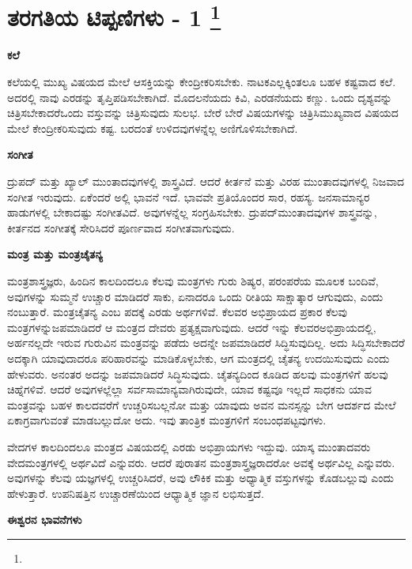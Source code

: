 
\chapter[ತರಗತಿಯ ಟಿಪ್ಪಣಿಗಳು - 1 ]{ತರಗತಿಯ ಟಿಪ್ಪಣಿಗಳು - 1 \protect\footnote{}}

\centerline{\textbf{ಕಲೆ}}

ಕಲೆಯಲ್ಲಿ ಮುಖ್ಯ ವಿಷಯದ ಮೇಲೆ ಆಸಕ್ತಿಯನ್ನು ಕೇಂದ್ರೀಕರಿಸಬೇಕು. ನಾಟಕ\break ಎಲ್ಲಕ್ಕಿಂತಲೂ ಬಹಳ ಕಷ್ಟವಾದ ಕಲೆ. ಅದರಲ್ಲಿ ನಾವು ಎರಡನ್ನು ತೃಪ್ತಿಪಡಿಸಬೇಕಾಗಿದೆ. ಮೊದಲನೆಯದು ಕಿವಿ, ಎರಡನೆಯದು ಕಣ್ಣು. ಒಂದು ದೃಶ್ಯವನ್ನು ಚಿತ್ರಿಸಬೇಕಾದರೆ\break ಒಂದು ವಸ್ತುವನ್ನು ಚಿತ್ರಿಸುವುದು ಸುಲಭ. ಬೇರೆ ಬೇರೆ ವಿಷಯಗಳನ್ನು ಚಿತ್ರಿಸಿ\break ಮುಖ್ಯವಾದ ವಿಷಯದ ಮೇಲೆ ಕೇಂದ್ರೀಕರಿಸುವುದು ಕಷ್ಟ. ಬರದಂತೆ ಉಳಿದವುಗಳನ್ನೆಲ್ಲ ಅಣಿಗೊಳಿಸಬೇಕಾಗಿದೆ.

\centerline{\textbf{ಸಂಗೀತ}}

ದ್ರುಪದ್​ ಮತ್ತು ಖ್ಯಾಲ್​ ಮುಂತಾದವುಗಳಲ್ಲಿ ಶಾಸ್ತ್ರವಿದೆ. ಆದರೆ ಕೀರ್ತನೆ ಮತ್ತು ವಿರಹ ಮುಂತಾದವುಗಳಲ್ಲಿ ನಿಜವಾದ ಸಂಗೀತ ಇರುವುದು. ಏಕೆಂದರೆ ಅಲ್ಲಿ ಭಾವನೆ ಇದೆ. ಭಾವವೇ ಪ್ರತಿಯೊಂದರ ಸಾರ, ರಹಸ್ಯ. ಜನಸಾಮಾನ್ಯರ ಹಾಡುಗಳಲ್ಲಿ ಬೇಕಾದಷ್ಟು ಸಂಗೀತವಿದೆ. ಅವುಗಳನ್ನೆಲ್ಲ ಸಂಗ್ರಹಿಸಬೇಕು. ದ್ರುಪದ್​ ಮುಂತಾದವುಗಳ ಶಾಸ್ತ್ರವನ್ನು, ಕೀರ್ತನದ ಸಂಗೀತಕ್ಕೆ ಸೇರಿಸಿದರೆ ಪೂರ್ಣವಾದ ಸಂಗೀತವಾಗುವುದು.

\centerline{\textbf{ಮಂತ್ರ ಮತ್ತು ಮಂತ್ರಚೈತನ್ಯ}}

ಮಂತ್ರಶಾಸ್ತ್ರಜ್ಞರು, ಹಿಂದಿನ ಕಾಲದಿಂದಲೂ ಕೆಲವು ಮಂತ್ರಗಳು ಗುರು ಶಿಷ್ಯರ, ಪರಂಪರೆಯ ಮೂಲಕ ಬಂದಿವೆ, ಅವುಗಳನ್ನು ಸುಮ್ಮನೆ ಉಚ್ಚಾರ ಮಾಡಿದರೆ ಸಾಕು, ಏನಾದರೂ ಒಂದು ರೀತಿಯ ಸಾಕ್ಷಾತ್ಕಾರ ಆಗುವುದು, ಎಂದು ನಂಬುತ್ತಾರೆ. ಮಂತ್ರಚೈತನ್ಯ ಎಂಬ ಪದಕ್ಕೆ ಎರಡು ಅರ್ಥಗಳಿವೆ. ಕೆಲವರ ಅಭಿಪ್ರಾಯದ ಪ್ರಕಾರ ಕೆಲವು ಮಂತ್ರಗಳನ್ನು\break ಜಪಮಾಡಿದರೆ ಆ ಮಂತ್ರದ ದೇವರು ಪ್ರತ್ಯಕ್ಷವಾಗುವುದು. ಆದರೆ ಇನ್ನು ಕೆಲವರ\break ಅಭಿಪ್ರಾಯದಲ್ಲಿ, ಅರ್ಹನಲ್ಲದೇ ಇರುವ ಗುರುವಿನ ಮಂತ್ರವನ್ನು ಪಡೆದು ಅದನ್ನೇ ಜಪಮಾಡಿದರೆ ಸಿದ್ಧಿಸುವುದಿಲ್ಲ. ಅದು ಸಿದ್ಧಿಸಬೇಕಾದರೆ ಅದಕ್ಕಾಗಿ ಯಾವುದಾದರೂ ಪರಿಹಾರವನ್ನು ಮಾಡಿಕೊಳ್ಳಬೇಕು, ಆಗ ಮಂತ್ರದಲ್ಲಿ ಚೈತನ್ಯ ಉದಯಿಸುವುದು ಎಂದು ಹೇಳುವರು. ಅನಂತರ ಅದನ್ನು ಜಪಮಾಡಿದರೆ ಸಿದ್ಧಿಸುವುದು. ಚೈತನ್ಯದಿಂದ ಕೂಡಿದ ಹಲವು ಮಂತ್ರಗಳಿಗೆ ಹಲವು ಚಿಹ್ನೆಗಳಿವೆ. ಆದರೆ ಅವುಗಳಲ್ಲೆಲ್ಲಾ ಸರ್ವಸಾಮಾನ್ಯವಾಗಿರುವುದೇ, ಯಾವ ಕಷ್ಟವೂ ಇಲ್ಲದೆ ಸಾಧಕನು ಯಾವ ಮಂತ್ರವನ್ನು ಬಹಳ ಕಾಲದವರೆಗೆ ಉಚ್ಚರಿಸಬಲ್ಲನೋ ಮತ್ತು ಯಾವುದು ಅವನ ಮನಸ್ಸನ್ನು ಬೇಗ ಆದರ್ಶದ ಮೇಲೆ ಏಕಾಗ್ರವಾಗುವಂತೆ ಮಾಡಬಲ್ಲುದೋ ಅದು. ಇವು ತಾಂತ್ರಿಕ ಮಂತ್ರಗಳಿಗೆ ಸಂಬಂಧಪಟ್ಟವುಗಳು.

ವೇದಗಳ ಕಾಲದಿಂದಲೂ ಮಂತ್ರದ ವಿಷಯದಲ್ಲಿ ಎರಡು ಅಭಿಪ್ರಾಯಗಳು ಇದ್ದುವು. ಯಾಸ್ಕ ಮುಂತಾದವರು ವೇದಮಂತ್ರಗಳಲ್ಲಿ ಅರ್ಥವಿದೆ ಎನ್ನುವರು. ಆದರೆ ಪುರಾತನ ಮಂತ್ರಶಾಸ್ತ್ರಜ್ಞರಾದರೋ ಅವಕ್ಕೆ ಅರ್ಥವಿಲ್ಲ ಎನ್ನುವರು. ಅವುಗಳನ್ನು ಕೆಲವು ಯಜ್ಞಗಳಲ್ಲಿ ಉಚ್ಚರಿಸಿದರೆ, ಅವು ಲೌಕಿಕ ಮತ್ತು ಅಧ್ಯಾತ್ಮಿಕ ವಸ್ತುಗಳನ್ನು ಕೊಡಬಲ್ಲುವು ಎಂದು ಹೇಳುತ್ತಾರೆ. ಉಪನಿಷತ್ತಿನ ಉಚ್ಚಾರಣೆಯಿಂದ ಆಧ್ಯಾತ್ಮಿಕ ಜ್ಞಾನ ಲಭಿಸುತ್ತದೆ.

\centerline{\textbf{ಈಶ್ವರನ ಭಾವನೆಗಳು}}


